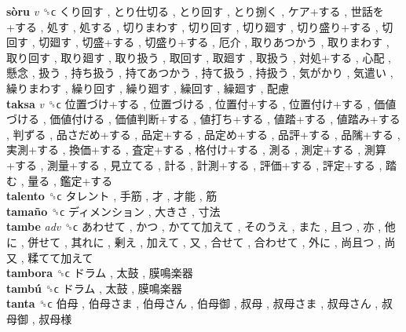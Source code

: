 \textbf{sòru} \emph{v}  ␝ϲ   くり回す ,  とり仕切る ,  とり回す ,  とり捌く ,  ケア+する ,  世話を+する ,  処す ,  処する ,  切りまわす ,  切り回す ,  切り廻す ,  切り盛り+する ,  切回す ,  切廻す ,  切盛+する ,  切盛り+する ,  厄介 ,  取りあつかう ,  取りまわす ,  取り回す ,  取り廻す ,  取り扱う ,  取回す ,  取廻す ,  取扱う ,  対処+する ,  心配 ,  懸念 ,  扱う ,  持ち扱う ,  持てあつかう ,  持て扱う ,  持扱う ,  気がかり ,  気遣い ,  繰りまわす ,  繰り回す ,  繰り廻す ,  繰回す ,  繰廻す ,  配慮   \\
\textbf{taksa} \emph{v}  ␝ϲ   位置づけ+する ,  位置づける ,  位置付+する ,  位置付け+する ,  価値づける ,  価値付ける ,  価値判断+する ,  値打ち+する ,  値踏+する ,  値踏み+する ,  判ずる ,  品さだめ+する ,  品定+する ,  品定め+する ,  品評+する ,  品隲+する ,  実測+する ,  換価+する ,  査定+する ,  格付け+する ,  測る ,  測定+する ,  測算+する ,  測量+する ,  見立てる ,  計る ,  計測+する ,  評価+する ,  評定+する ,  踏む ,  量る ,  鑑定+する   \\
\textbf{talento} ␝ϲ   タレント ,  手筋 ,  才 ,  才能 ,  筋   \\
\textbf{tamaño} ␝ϲ   ディメンション ,  大きさ ,  寸法   \\
\textbf{tambe} \emph{adv}  ␝ϲ   あわせて ,  かつ ,  かてて加えて ,  そのうえ ,  また ,  且つ ,  亦 ,  他に ,  併せて ,  其れに ,  剰え ,  加えて ,  又 ,  合せて ,  合わせて ,  外に ,  尚且つ ,  尚又 ,  糅てて加えて   \\
\textbf{tambora} ␝ϲ   ドラム ,  太鼓 ,  膜鳴楽器   \\
\textbf{tambú} ␝ϲ   ドラム ,  太鼓 ,  膜鳴楽器   \\
\textbf{tanta} ␝ϲ   伯母 ,  伯母さま ,  伯母さん ,  伯母御 ,  叔母 ,  叔母さま ,  叔母さん ,  叔母御 ,  叔母様   \\
